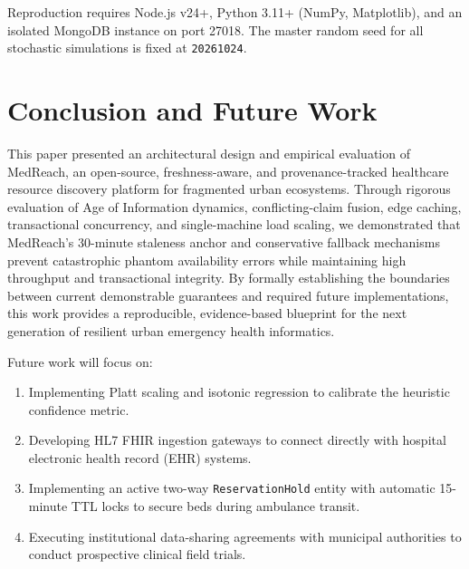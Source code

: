 \documentclass[conference]{IEEEtran}
\begin{document}
Reproduction requires Node.js v24+, Python 3.11+ (NumPy, Matplotlib), and an isolated MongoDB instance on port 27018. The master random seed for all stochastic simulations is fixed at \texttt{20261024}.

\section{Conclusion and Future Work}

This paper presented an architectural design and empirical evaluation of MedReach, an open-source, freshness-aware, and provenance-tracked healthcare resource discovery platform for fragmented urban ecosystems. Through rigorous evaluation of Age of Information dynamics, conflicting-claim fusion, edge caching, transactional concurrency, and single-machine load scaling, we demonstrated that MedReach's 30-minute staleness anchor and conservative fallback mechanisms prevent catastrophic phantom availability errors while maintaining high throughput and transactional integrity. By formally establishing the boundaries between current demonstrable guarantees and required future implementations, this work provides a reproducible, evidence-based blueprint for the next generation of resilient urban emergency health informatics.

Future work will focus on:
\begin{enumerate}
    \item Implementing Platt scaling and isotonic regression to calibrate the heuristic confidence metric.
    \item Developing HL7 FHIR ingestion gateways to connect directly with hospital electronic health record (EHR) systems.
    \item Implementing an active two-way \texttt{ReservationHold} entity with automatic 15-minute TTL locks to secure beds during ambulance transit.
    \item Executing institutional data-sharing agreements with municipal authorities to conduct prospective clinical field trials.
\end{enumerate}



\end{document}
